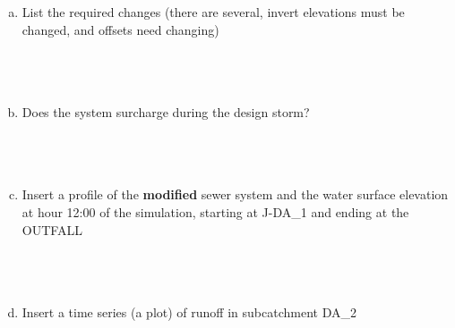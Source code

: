 \documentclass[12pt]{article}
\begin{document}
\begin{enumerate}
\begin{enumerate}[a)]
Modify your model to make pipes P\_1 and P\_2, into 5.0 foot diameter pipes, keeping them at least 2 feet below grade.  
\item List the required changes (there are several, invert elevations must be changed, and offsets need changing) \\~\\~\\~\\
\item Does the system surcharge during the design storm?  \\~\\~\\~\\
\item Insert a profile of the \textbf{modified} sewer system and the water surface elevation at hour 12:00 of the simulation, starting at J-DA\_1 and ending at the OUTFALL \\~\\~\\~\\
\item Insert a time series (a plot) of runoff in subcatchment DA\_2  \\~\\~\\~\\
\end{enumerate}














\end{enumerate}
\end{document}
